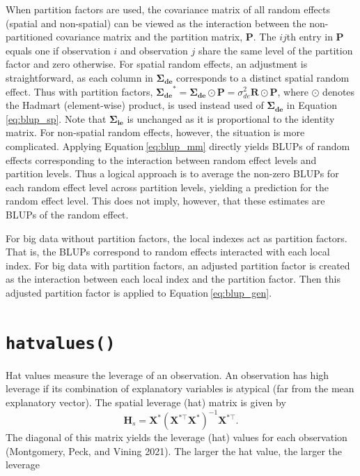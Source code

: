 \documentclass{article}
\begin{document}
When partition factors are used, the covariance matrix of all random
effects (spatial and non-spatial) can be viewed as the interaction
between the non-partitioned covariance matrix and the partition matrix,
\(\mathbf{P}\). The \(ij\)th entry in \(\mathbf{P}\) equals one if
observation \(i\) and observation \(j\) share the same level of the
partition factor and zero otherwise. For spatial random effects, an
adjustment is straightforward, as each column in
\(\boldsymbol{\Sigma_{de}}\) corresponds to a distinct spatial random
effect. Thus with partition factors,
\(\boldsymbol{\Sigma_{de}}^* = \boldsymbol{\Sigma_{de}} \odot \mathbf{P} = \sigma^2_{de} \mathbf{R} \odot \mathbf{P}\),
where \(\odot\) denotes the Hadmart (element-wise) product, is used
instead used of \(\boldsymbol{\Sigma_{de}}\) in
Equation\(~\)\ref{eq:blup_sp}. Note that \(\boldsymbol{\Sigma_{ie}}\) is
unchanged as it is proportional to the identity matrix. For non-spatial
random effects, however, the situation is more complicated. Applying
Equation\(~\)\ref{eq:blup_mm} directly yields BLUPs of random effects
corresponding to the interaction between random effect levels and
partition levels. Thus a logical approach is to average the non-zero
BLUPs for each random effect level across partition levels, yielding a
prediction for the random effect level. This does not imply, however,
that these estimates are BLUPs of the random effect.

For big data without partition factors, the local indexes act as
partition factors. That is, the BLUPs correspond to random effects
interacted with each local index. For big data with partition factors,
an adjusted partition factor is created as the interaction between each
local index and the partition factor. Then this adjusted partition
factor is applied to Equation\(~\)\ref{eq:blup_gen}.

\hypertarget{sec:hatvalues}{%
\section{\texorpdfstring{\texttt{hatvalues()}}{hatvalues()}}\label{sec:hatvalues}}

Hat values measure the leverage of an observation. An observation has
high leverage if its combination of explanatory variables is atypical
(far from the mean explanatory vector). The spatial leverage (hat)
matrix is given by \begin{equation}
\label{eq:leverage}
 \mathbf{H}_s = \mathbf{X}^* (\mathbf{X}^{* \top} \mathbf{X}^*)^{-1} \mathbf{X}^{* \top}.
\end{equation} The diagonal of this matrix yields the leverage (hat)
values for each observation (Montgomery, Peck, and Vining 2021). The
larger the hat value, the larger the leverage
\end{document}
